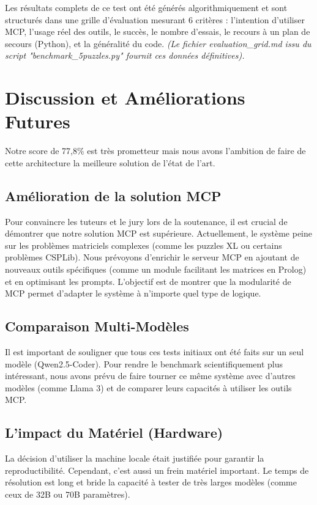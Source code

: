 \documentclass[12pt,a4paper]{article}
\begin{document}
Les résultats complets de ce test ont été générés algorithmiquement et sont structurés dans une grille d'évaluation mesurant 6 critères : l'intention d'utiliser MCP, l'usage réel des outils, le succès, le nombre d'essais, le recours à un plan de secours (Python), et la généralité du code. 
\textit{(Le fichier evaluation\_grid.md issu du script "benchmark\_5puzzles.py" fournit ces données définitives).}

\section{Discussion et Améliorations Futures}

Notre score de 77,8\% est très prometteur mais nous avons l'ambition de faire de cette architecture la meilleure solution de l'état de l'art.

\subsection{Amélioration de la solution MCP}
Pour convaincre les tuteurs et le jury lors de la soutenance, il est crucial de démontrer que notre solution MCP est supérieure. Actuellement, le système peine sur les problèmes matriciels complexes (comme les puzzles XL ou certains problèmes CSPLib). Nous prévoyons d'enrichir le serveur MCP en ajoutant de nouveaux outils spécifiques (comme un module facilitant les matrices en Prolog) et en optimisant les prompts. L'objectif est de montrer que la modularité de MCP permet d'adapter le système à n'importe quel type de logique.

\subsection{Comparaison Multi-Modèles}
Il est important de souligner que tous ces tests initiaux ont été faits sur un seul modèle (Qwen2.5-Coder). Pour rendre le benchmark scientifiquement plus intéressant, nous avons prévu de faire tourner ce même système avec d'autres modèles (comme Llama 3) et de comparer leurs capacités à utiliser les outils MCP.

\subsection{L'impact du Matériel (Hardware)}
La décision d'utiliser la machine locale était justifiée pour garantir la reproductibilité. Cependant, c'est aussi un frein matériel important. Le temps de résolution est long et bride la capacité à tester de très larges modèles (comme ceux de 32B ou 70B paramètres).
\end{document}
